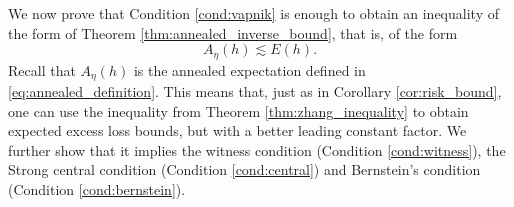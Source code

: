 \documentclass{uvamath}
\newcommand*{\calH}{\mathcal{H}}
\newcommand*{\bbP}{\mathbb{P}}
\newcommand*{\prob}[2][]{\mathbb{P}_{#1}\left\{#2\right\}}
\newcommand*{\indicator}[1]{\mathbbm{1}\left\{#1\right\}}
\newcommand*{\paren}[1]{\left(#1\right)}
\theoremstyle{remark}
\newtheorem{remark}[theorem]{Remark}
\theoremstyle{definition}
\theoremstyle{definition}
\theoremstyle{definition}
\theoremstyle{definition}
\theoremstyle{definition}
\begin{document}


We now prove that Condition \ref{cond:vapnik} is enough to obtain an
inequality of the form of Theorem \ref{thm:annealed_inverse_bound},
that is, of the form
\begin{equation*}
  A_{\eta}(h)\lesssim E(h).
\end{equation*}
Recall that $A_\eta(h)$ is the annealed expectation defined in
\eqref{eq:annealed_definition}. This means that, just as in Corollary
\ref{cor:risk_bound}, one can use the inequality from Theorem
\ref{thm:zhang_inequality} to obtain expected excess loss bounds, but
with a better leading constant factor. We further show that it implies
the witness condition (Condition \ref{cond:witness}), the Strong
central condition (Condition \ref{cond:central}) and Bernstein's
condition (Condition \ref{cond:bernstein}).
\end{document}
